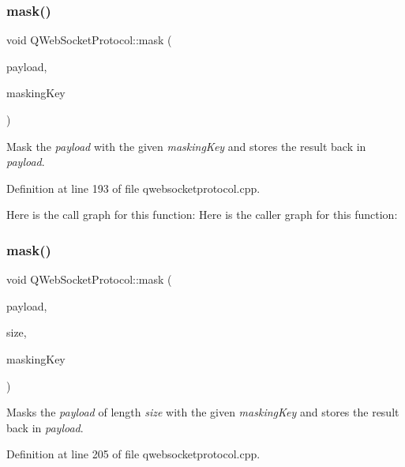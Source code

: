 \mbox{\label{namespace_q_web_socket_protocol_aea90bd0da715cf6b30e614c8891e09ad}} 
\subsubsection{\texorpdfstring{mask()}{mask()}\hspace{0.1cm}{\footnotesize\ttfamily [1/2]}}
{\footnotesize\ttfamily void Q\+Web\+Socket\+Protocol\+::mask (\begin{DoxyParamCaption}\item[{Q\+Byte\+Array $\ast$}]{payload,  }\item[{quint32}]{masking\+Key }\end{DoxyParamCaption})}

Mask the {\itshape payload} with the given {\itshape masking\+Key} and stores the result back in {\itshape payload}. 

Definition at line 193 of file qwebsocketprotocol.\+cpp.

Here is the call graph for this function\+:
Here is the caller graph for this function\+:
\mbox{\label{namespace_q_web_socket_protocol_a2e4aa8206ec620864463ef4a30816b58}} 
\subsubsection{\texorpdfstring{mask()}{mask()}\hspace{0.1cm}{\footnotesize\ttfamily [2/2]}}
{\footnotesize\ttfamily void Q\+Web\+Socket\+Protocol\+::mask (\begin{DoxyParamCaption}\item[{char $\ast$}]{payload,  }\item[{quint64}]{size,  }\item[{quint32}]{masking\+Key }\end{DoxyParamCaption})}

Masks the {\itshape payload} of length {\itshape size} with the given {\itshape masking\+Key} and stores the result back in {\itshape payload}. 

Definition at line 205 of file qwebsocketprotocol.\+cpp.

